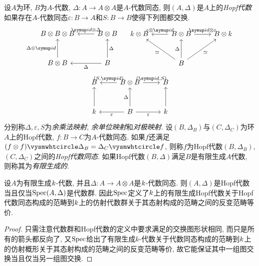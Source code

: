 \begin{definition}
  设$A$为环, $B$为$A$-代数, $\Delta\colon A\to A\otimes A$是$A$-代数同态, 则$(A, \Delta)$是$A$上的\emph{Hopf代数}如果存在$A$-代数同态$\varepsilon\colon B\to A$和$S\colon B\to B$使得下列图都交换.
  \begin{equation*}
    \begin{tikzcd}[row sep=large]
      B\otimes B\otimes B & B\otimes B\\
      B\otimes B & B
      \arrow[from=1-1,leftarrow]{1-2}{\id\otimes \Delta}
      \arrow[from=1-1,leftarrow]{2-1}[swap]{\Delta\otimes \id}
      \arrow[from=1-2,leftarrow]{2-2}{\Delta}
      \arrow[from=2-1,leftarrow]{2-2}[swap]{\Delta}
    \end{tikzcd}
    \quad
    \begin{tikzcd}[row sep=large]
      \kk\otimes B & B\otimes B & B\otimes \kk\\
      & B &
      \arrow[from=1-1,leftarrow]{1-2}{\varepsilon\otimes \id}
      \arrow[from=1-3,leftarrow]{1-2}[swap]{\id\otimes \varepsilon}
      \arrow[from=1-1,leftarrow]{2-2}[swap]{\simeq}
      \arrow[from=1-3,leftarrow]{2-2}{\simeq}
      \arrow[from=1-2,leftarrow]{2-2}[swap]{\Delta}
    \end{tikzcd}
  \end{equation*}
  \begin{equation*}
    \begin{tikzcd}[row sep=large]
      B & B\otimes B & B\\
      \kk & B & \kk
      \arrow[from=1-1,leftarrow]{1-2}{(S, \id)}
      \arrow[from=1-2,]{1-3}{(\id, S)}
      \arrow[from=2-1,leftarrow]{2-2}[swap]{\varepsilon}
      \arrow[from=2-2,]{2-3}[swap]{\varepsilon}
      \arrow[from=1-1,leftarrow]{2-1}[swap]{}
      \arrow[from=1-2,leftarrow]{2-2}[swap]{\Delta}
      \arrow[from=1-3,leftarrow]{2-3}{}
    \end{tikzcd}
  \end{equation*}
  分别称$\Delta, \varepsilon, S$为\emph{余乘法映射}, \emph{余单位映射}和\emph{对极映射}. 设$(B, \Delta_B)$与$(C, \Delta_C)$为环$A$上的Hopf代数, $f\colon B\to C$为$A$-代数同态. 如果$f$还满足$(f\otimes f)\composite\Delta_B=\Delta_C\composite f$, 则称$f$为Hopf代数$(B, \Delta_B)$, $(C, \Delta_C)$之间的\emph{Hopf代数同态}. 如果Hopf代数$(B, \Delta)$满足$B$是有限生成$A$代数, 则称其为\emph{有限生成的}.
\end{definition}

\begin{theorem}
  设$A$为有限生成$k$-代数, 并且$\Delta\colon A\to A\otimes A$是$k$-代数同态. 则$(A, \Delta)$是Hopf代数当且仅当$\operatorname{Spec}(A, \Delta)$是代数群. 因此$\operatorname{Spec}$定义了$k$上的有限生成Hopf代数关于Hopf代数同态构成的范畴到$k$上的仿射代数群关于其态射构成的范畴之间的反变范畴等价.
\end{theorem}

\begin{proof}
  只需注意代数群和Hopf代数的定义中要求满足的交换图形状相同, 而只是所有的箭头都反向了, 又$\operatorname{Spec}$给出了有限生成$k$-代数关于代数同态构成的范畴到$k$上的仿射概形关于其态射构成的范畴之间的反变范畴等价, 故它能保证其中一组图交换当且仅当另一组图交换.
\end{proof}

